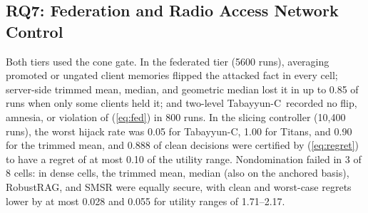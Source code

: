 \documentclass[journal]{IEEEtran}
\theoremstyle{remark}
\newcommand{\TabC}{\mbox{Tabayyun-C}}
\begin{document}
\begin{table}[!t]
\caption{Real Sources (Tier R; Acc.: Mean Accuracy; Inst.: Worst Installed Rate Over $f\in\{1,2,4\}$) and Memory Inside the Network (Tier M; Rec.: Clean Recall; Inst.: Worst Installed Rate of the Emitted Token Over 16 Cells and Three Static Attacks)}
\label{tab:real}
\centering\footnotesize
\setlength{\tabcolsep}{3pt}
\end{table}

\subsection{RQ7: Federation and Radio Access Network Control}
Both tiers used the cone gate. In the federated tier (5600 runs), averaging promoted or ungated client memories flipped the attacked fact in every cell; server-side trimmed mean, median, and geometric median lost it in up to 0.85 of runs when only some clients held it; and two-level \TabC\ recorded no flip, amnesia, or violation of (\ref{eq:fed}) in 800 runs. In the slicing controller (10,400 runs), the worst hijack rate was 0.05 for \TabC, 1.00 for Titans, and 0.90 for the trimmed mean, and 0.888 of clean decisions were certified by (\ref{eq:regret}) to have a regret of at most 0.10 of the utility range. Nondomination failed in 3 of 8 cells: in dense cells, the trimmed mean, median (also on the anchored basis), RobustRAG, and SMSR were equally secure, with clean and worst-case regrets lower by at most 0.028 and 0.055 for utility ranges of 1.71--2.17.
\end{document}
